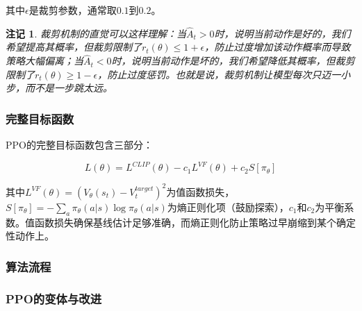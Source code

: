 \documentclass[12pt,a4paper]{article}
\newenvironment{algorithmic}[1][]%
      {\begin{list}{}{\leftmargin=2em\itemsep=0.2em\parsep=0pt\topsep=0.2em}}%
      {\end{list}}
\newcommand{\STATE}{\item[]}
\newcommand{\FOR}[1]{\item[]\textbf{for} ##1 \textbf{do}}
\newcommand{\ENDFOR}{\item[]\textbf{end for}}
\newtheorem{remark}[theorem]{注记}
\begin{document}
其中$\epsilon$是裁剪参数，通常取$0.1$到$0.2$。

\begin{remark}
裁剪机制的直觉可以这样理解：当$\hat{A}_t > 0$时，说明当前动作是好的，我们希望提高其概率，但裁剪限制了$r_t(\theta) \leq 1+\epsilon$，防止过度增加该动作概率而导致策略大幅偏离；当$\hat{A}_t < 0$时，说明当前动作是坏的，我们希望降低其概率，但裁剪限制了$r_t(\theta) \geq 1-\epsilon$，防止过度惩罚。也就是说，裁剪机制让模型每次只迈一小步，而不是一步跳太远。
\end{remark}

\subsubsection{完整目标函数}

PPO的完整目标函数包含三部分：

\begin{equation}
L(\theta) = L^{CLIP}(\theta) - c_1 L^{VF}(\theta) + c_2 S[\pi_\theta]
\end{equation}

其中$L^{VF}(\theta) = (V_\theta(s_t) - V_t^{target})^2$为值函数损失，$S[\pi_\theta] = -\sum_a \pi_\theta(a|s) \log \pi_\theta(a|s)$为熵正则化项（鼓励探索），$c_1$和$c_2$为平衡系数。值函数损失确保基线估计足够准确，而熵正则化防止策略过早崩缩到某个确定性动作上。

\subsubsection{算法流程}


\subsubsection{PPO的变体与改进}
\end{document}

